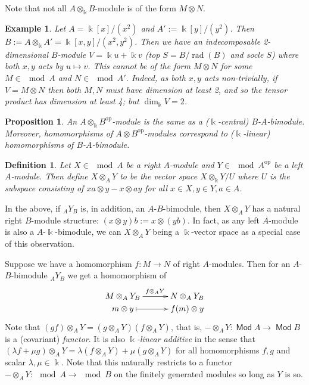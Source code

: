 \documentclass[11pt,a4paper]{article}
\numberwithin{equation}{section}
\theoremstyle{all}
\newtheorem{proposition}[theorem]{Proposition}
\newtheorem{example}[theorem]{Example}
\newtheorem{definition}[theorem]{Definition}
\theoremstyle{remark}
\newcommand{\rad}{\operatorname{rad}\nolimits}
\newcommand{\op}{\mathrm{op}}
\DeclareMathOperator{\Mod}{\mathsf{Mod}}
\newcommand{\defn}[1]{\textsl{\color{darkblue} #1}}
\begin{document}
Note that not all $A\otimes_{\Bbbk}B$-module is of the form $M\otimes N$.
\begin{example}
Let $A=\Bbbk[x]/(x^2)$ and $A':=\Bbbk[y]/(y^2)$.
Then $B:=A\otimes_{\Bbbk}A' = \Bbbk[x,y]/(x^2,y^2)$.
Then we have an indecomposable 2-dimensional $B$-module $V=\Bbbk u+\Bbbk v$ (top $S=B/\rad(B)$ and socle $S$) where both $x,y$ acts by $u\mapsto v$.
This cannot be of the form $M\otimes N$ for some $M\in\mod A$ and $N\in \mod A'$. Indeed, as both $x,y$ acts non-trivially, if $V=M\otimes N$ then both $M,N$ must have dimension at least 2, and so the tensor product has dimension at least 4; but $\dim_{\Bbbk}V=2$.
\end{example}

\begin{proposition}
An $A\otimes_{\Bbbk}B^\op$-module is the same as a ($\Bbbk$-central) $B$-$A$-bimodule.
Moreover, homomorphisms of $A\otimes B^\op$-modules correspond to ($\Bbbk$-linear) homomorphisms of $B$-$A$-bimodule.
\end{proposition}

\begin{definition}
Let $X\in \mod A$ be a right $A$-module and $Y\in \mod A^\op$ be a left $A$-module.
Then define $X\otimes_A Y$ to be the vector space $X\otimes_{\Bbbk} Y/U$ where $U$ is the subspace consisting of $xa\otimes y-x\otimes ay$ for all $x\in X, y\in Y, a\in A$.
\end{definition}

In the above, if ${}_AY_B$ is, in addition, an $A$-$B$-bimodule, then $X\otimes_AY$ has a natural right $B$-module structure: $(x\otimes y)b:=x\otimes(yb)$.  
In fact, as any left $A$-module is also a $A$-$\Bbbk$-bimodule, we can $X\otimes_A Y$ being a $\Bbbk$-vector space as a special case of this observation.

Suppose we have a homomorphism $f:M\to N$ of right $A$-modules.
Then for an $A$-$B$-bimodule ${}_AY_B$ we get a homomorphism of
\begin{align*}
\xymatrix@R=0pt@C=30pt{ M\otimes_A Y_B \ar[r]^{f\otimes_AY}&  N\otimes_AY_B \\
m\otimes y  \ar@{|->}[r] & f(m)\otimes y }
\end{align*}
Note that $(gf)\otimes_AY = (g\otimes_AY)(f\otimes_AY)$, that is, $-\otimes_AY:\Mod A\to \Mod B$ is a (covariant) \defn{functor}.
It is also \defn{$\Bbbk$-linear additive} in the sense that $(\lambda f+\mu g)\otimes_AY=\lambda (f\otimes_AY)+\mu (g\otimes_AY)$ for all homomorphisms $f,g$ and scalar $\lambda,\mu\in\Bbbk$.
Note that this naturally restricts to a functor $-\otimes_AY: \mod A\to \mod B$ on the finitely generated modules so long as $Y$ is so.
\end{document}
